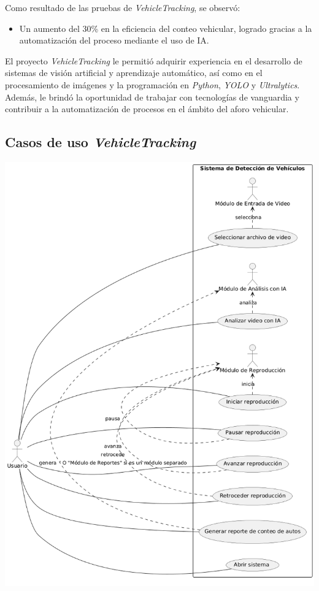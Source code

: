\documentclass[protocolo.tex]{subfiles}
\begin{document}
Como resultado de las pruebas de \textit{VehicleTracking}, se observó:

\begin{itemize}
\item Un aumento del 30\% en la eficiencia del conteo vehicular,  logrado gracias a la automatización del proceso mediante el uso de IA.
\end{itemize}

El proyecto \textit{VehicleTracking} le permitió adquirir experiencia en el desarrollo de sistemas de visión artificial y aprendizaje automático, así como en el procesamiento de imágenes y la programación en  \textit{Python},  \textit{YOLO} y  \textit{Ultralytics}.  Además, le brindó la oportunidad de trabajar con tecnologías de vanguardia y contribuir a la automatización de procesos en el ámbito del aforo vehicular.

\subsection{Casos de uso \textit{VehicleTracking}} 

\includegraphics[scale=0.5]{Imagenes/vehicle.png}
\end{document}
